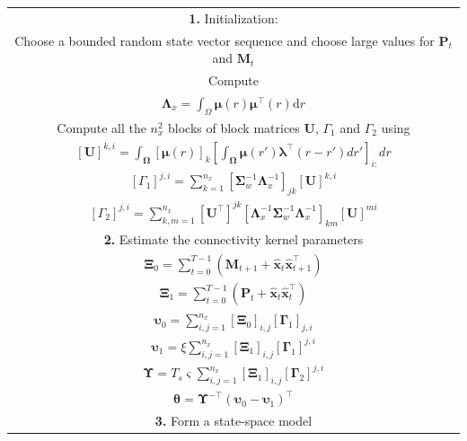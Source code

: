 \documentclass[review,authoryear,3p]{elsarticle}
\begin{document}
\renewcommand{\arraystretch}{1.7}
\begin{table}[!ht]
\begin{tabular}{|c|}\hline
\multicolumn{1}{|p{16cm}|}{\textbf{1.} Initialization:  } \\ 
\multicolumn{1}{|p{16cm}|}{Choose a bounded random state vector sequence and choose large values for $\mathbf P_t$ and $\mathbf M_t$} \\
\multicolumn{1}{|p{16cm}|}{Compute} \\
$\mathbf{\Lambda}_{x}=\int_{\Omega}\boldsymbol{\mu}\left(r\right)\boldsymbol{\mu}^\top\left(r\right) \mathrm{d}r$\\
\multicolumn{1}{|p{16cm}|}{Compute all the $n^2_x$ blocks of block matrices $\mathbf U$, $\Gamma_1$ and  $\Gamma_2$ using} \\
$\left[ \mathbf U\right] ^{k,i}=\int_{\boldsymbol \Omega}\left[\boldsymbol\mu(r) \right]_k \left[\int_{\boldsymbol\Omega} \boldsymbol\mu\left(r'\right)\boldsymbol \lambda^\top \left(r-r'\right) dr'\right]_{i:} dr$\\
$\left[ \Gamma_1\right]^{j,i} =\sum_{k=1}^{n_x}\left[ \boldsymbol\Sigma_w^{-1}\boldsymbol\Lambda_x^{-1}\right]_{jk} \left[ \mathbf U\right]^{k,i}$\\
$\left[ \Gamma_2\right] ^{j,i}=\sum_{k,m=1}^{n_x}[\mathbf U^{\top}]^{jk} \left[\boldsymbol\Lambda_x^{-1}\boldsymbol\Sigma_w^{-1}\boldsymbol\Lambda_x^{-1} \right]_{km}[\mathbf U]^{mi}$\\
\hline
\multicolumn{1}{|p{16cm}|}{\textbf{2.} Estimate the connectivity kernel parameters} \\
$\boldsymbol\Xi_0=\sum_{t=0}^{T-1}\left(\mathbf M_{t+1}+\mathbf{\hat x}_t\mathbf{\hat x}_{t+1}^\top\right)$\\
$\boldsymbol\Xi_1=\sum_{t=0}^{T-1}\left(\mathbf P_t+\mathbf{\hat x}_t\mathbf{\hat x}_t^\top\right)$\\
$\boldsymbol\upsilon_0=\sum_{i,j=1}^{n_x}[\boldsymbol\Xi_0]_{i,j}[\boldsymbol\Gamma_1]_{j,i}$\\
$\boldsymbol\upsilon_1=\xi\sum_{i,j=1}^{n_x}[\boldsymbol\Xi_1]_{i,j}[\boldsymbol\Gamma_1]^{j,i}$\\
$\boldsymbol\Upsilon=T_s\varsigma\sum_{i,j=1}^{n_x}[\boldsymbol\Xi_1]_{i,j}[\boldsymbol\Gamma_2]^{j,i}$\\
$\boldsymbol \theta= \boldsymbol\Upsilon^{-\top}(\boldsymbol\upsilon_0-\boldsymbol\upsilon_1)^\top$\\
\hline
\multicolumn{1}{|p{16cm}|}{\textbf{3.} Form a state-space model}\\

\end{tabular}
\end{table}
\end{document}
